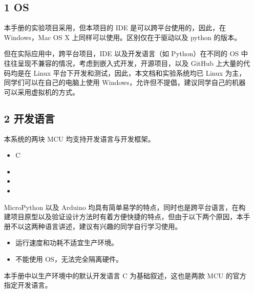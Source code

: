 \documentclass[a4paper,12pt,english]{sphinxmanual}
\begin{document}
\subsection{1 OS}
\label{\detokenize{dev-board/ide:os}}
\sphinxAtStartPar
本手册的实验项目采用，但本项目的 IDE 是可以跨平台使用的，因此，在 Windows，Mac OS X 上同样可以使用。区别仅在于驱动以及 python 的版本。

\sphinxAtStartPar
但在实际应用中，跨平台项目，IDE 以及开发语言（如 Python）在不同的 OS 中往往呈现不兼容的情况，考虑到嵌入式开发，开源项目，以及 GitHub 上大量的代码均是在 Linux 平台下开发和测试，因此，本文档和实验系统均已 Linux 为主，同学们可以在自己的电脑上使用 Windows，允许但不提倡，建议同学自己的机器可以采用虚拟机的方式。


\subsection{2 开发语言}
\label{\detokenize{dev-board/ide:id2}}
\sphinxAtStartPar
本系统的两块 MCU 均支持开发语言与开发框架。
\begin{itemize}
\item {} 
\sphinxAtStartPar
C

\item {} 
\sphinxAtStartPar
{}

\item {} 
\sphinxAtStartPar
{}

\item {} 
\sphinxAtStartPar
{}

\end{itemize}

\sphinxAtStartPar
MicroPython 以及 Arduino 均具有简单易学的特点，同时也是跨平台语言，在构建项目原型以及验证设计方法时有着方便快捷的特点，但由于以下两个原因，本手册不以这两种语言讲述，建议有兴趣的同学自行学习使用。
\begin{itemize}
\item {} 
\sphinxAtStartPar
运行速度和功耗不适宜生产环境。

\item {} 
\sphinxAtStartPar
不能使用 OS，无法完全隔离硬件。

\end{itemize}

\sphinxAtStartPar
本手册中以生产环境中的默认开发语言 C 为基础叙述，这也是两款 MCU 的官方指定开发语言。
\end{document}
